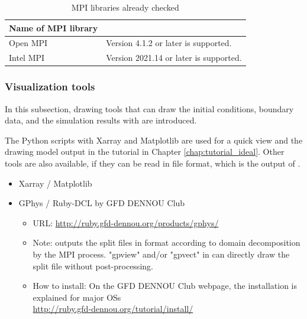 \begin{table}[tb]
\begin{center}
\caption{MPI libraries already checked}
\begin{tabularx}{150mm}{|l|X|} \hline
 \rowcolor[gray]{0.9} Name of MPI library &  \\ \hline
  Open MPI               & Version 4.1.2 or later is supported. \\ \hline
  Intel MPI             & Version 2021.14 or later is supported.\\ \hline
\end{tabularx}
\label{tab:compatible_mpi}
\end{center}
\end{table}


\subsubsection{Visualization tools}

In this subsection, drawing tools that can draw the initial conditions, boundary data, and the simulation results with \scaledg are introduced.

The Python scripts with Xarray and Matplotlib are used for a quick view
and the drawing model output in the tutorial in Chapter \ref{chap:tutorial_ideal}.
Other tools are also available,
if they can be read in \netcdf file format, which is the output of \scaledg.

\begin{itemize}
\item Xarray / Matplotlib

\item GPhys / Ruby-DCL by GFD DENNOU Club
 \begin{itemize}
  \item URL: \url{http://ruby.gfd-dennou.org/products/gphys/}
  \item Note: \scalelib outputs the split files
  in {\netcdf} format according to domain decomposition by the MPI process.
  "gpview" and/or "gpvect" in {\gphys} can directly draw the split file without post-processing.
  \item How to install:
  On the GFD DENNOU Club webpage, the installation is explained for major OSs\\
  \url{http://ruby.gfd-dennou.org/tutorial/install/}\\
   \end{itemize}
\end{itemize}


